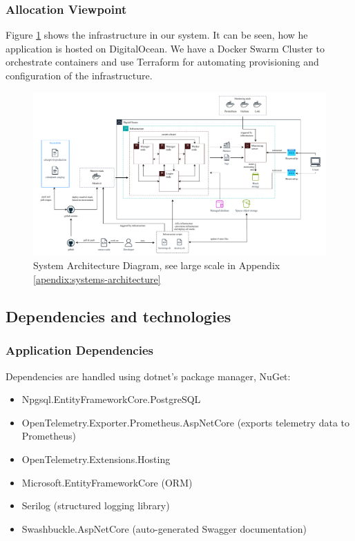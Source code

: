 \subsubsection{Allocation Viewpoint}
Figure \ref{fig:architecture} shows the infrastructure in our system.
It can be seen, how he application is hosted on DigitalOcean. We have a Docker Swarm Cluster to orchestrate containers and use Terraform for automating provisioning and configuration of the infrastructure.


\begin{figure}[H]
    \centering
    \includegraphics[width=1.0\textwidth]{figures/devops-architecture-architecture_v2.pdf}
    \caption{System Architecture Diagram, see large scale in Appendix \ref{apendix:systems-architecture}}
    \label{fig:architecture}
\end{figure}

\subsection{Dependencies and technologies}
\subsubsection{Application Dependencies}
Dependencies are handled using dotnet's package manager, NuGet:
\begin{itemize}
    \item Npgsql.EntityFrameworkCore.PostgreSQL 
    \item OpenTelemetry.Exporter.Prometheus.AspNetCore (exports telemetry data to Prometheus)
    \item OpenTelemetry.Extensions.Hosting
    \item Microsoft.EntityFrameworkCore (ORM)
    \item Serilog (structured logging library)
    \item Swashbuckle.AspNetCore (auto-generated Swagger documentation)
\end{itemize}

